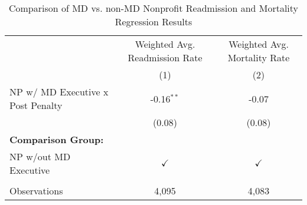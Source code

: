 \begin{table}[htbp]
   \caption{\label{tab:MD_noMD_fullsample} Comparison of MD vs. non-MD Nonprofit Readmission and Mortality Regression Results}
   \bigskip
   \centering
   \begin{tabular}{lcc}
      \toprule
                                        & Weighted Avg. Readmission Rate & Weighted Avg. Mortality Rate\\  
                                        & (1)                            & (2)\\  
      \midrule 
      NP w/ MD Executive x Post Penalty & -0.16$^{**}$                   & -0.07\\   
                                        & (0.08)                         & (0.08)\\   
      \textbf{Comparison Group:}        &                                & \\  
      NP w/out MD Executive             & $\checkmark$                   & $\checkmark$\\   
       \\
      Observations                      & 4,095                          & 4,083\\  
      \bottomrule
   \end{tabular}
\end{table}
